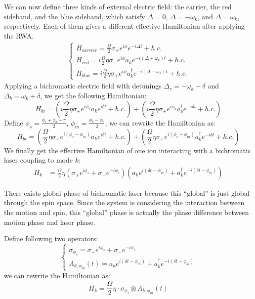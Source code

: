 \documentclass{notes2}
\begin{document}
We can now define three kinds of external electric field: the carrier, the red sideband, and the blue sideband, which satisfy $\Delta = 0$, $\Delta = - \omega_k$, and $\Delta = \omega_k$, respectively. Each of them gives a different effective Hamiltonian after applying the RWA.
\begin{align}
    \begin{cases*}
    H_{carrier} = \frac{\Omega}{2} \sigma_+ e^{i\phi}e^{-i\Delta t} + h.c. \\
    H_{red} = i \frac{\Omega}{2} \eta \sigma_+ e^{i\phi} a_k e^{-i(\Delta + \omega_k) t} + h.c. \\
    H_{blue} = i \frac{\Omega}{2} \eta \sigma_+ e^{i\phi} a_k^\dagger e^{-i(\Delta - \omega_k) t} + h.c.
    \end{cases*}
\end{align}
Applying a bichromatic electric field with detunings $\Delta_{r} = - \omega_k - \delta$ and $\Delta_{b} = \omega_k + \delta$, we get the following Hamiltonian:
\begin{equation}
    H_{bi} = (i \frac{\Omega}{2} \eta \sigma_+ e^{i\phi_r} a_k e^{i\delta t} + h.c.) + (i \frac{\Omega}{2} \eta \sigma_+ e^{i\phi_b} a_k^\dagger e^{-i\delta t} + h.c.)
\end{equation}
Define $\phi_s = \frac{\phi_r + \phi_b + \pi}{2}$, $\phi_m = \frac{\phi_b - \phi_r}{2}$, we can rewrite the Hamiltonian as:
\begin{equation}
    H_{bi} = ( \frac{\Omega}{2} \eta \sigma_+ e^{i(\phi_s - \phi_m)} a_k e^{i\delta t} + h.c.) + ( \frac{\Omega}{2} \eta \sigma_+ e^{i(\phi_s + \phi_m)} a_k^\dagger e^{-i\delta t} + h.c.)
\end{equation}
We finally get the effective Hamiltonian of one ion interacting with a bichromatic laser coupling to mode $k$:
\begin{align}
    H_k &= \frac{\Omega}{2} \eta (\sigma_+ e^{i\phi_s} + \sigma_- e^{-i\phi_s})(a_k e^{i(\delta t - \phi_m)} + a_k^\dagger e^{-i(\delta t - \phi_m)})
\end{align}
\begin{notebox}
There exists global phase of bichromatic laser because this ``global'' is just global through the spin space. Since the system is considering the interaction between the motion and spin, this ``global'' phase is actually the phase difference between motion phase and laser phase. 
\end{notebox}
Define following two operators:
\begin{equation}
    \begin{cases}
        \sigma_{\phi_s} = \sigma_+ e^{i\phi_s} + \sigma_- e^{-i\phi_s} \\
        A_{k, \phi_m}(t) = a_k e^{i(\delta t - \phi_m)} + a_k^\dagger e^{-i(\delta t - \phi_m)}
    \end{cases}
\end{equation}
we can rewrite the Hamiltonian as:
\begin{equation}
        H_k = \frac{\Omega}{2} \eta \cdot\sigma_{\phi_s}\otimes A_{k, \phi_m}(t) \tag{Effective Hamiltonian for bichromatic laser coupling}
\end{equation}
\end{document}

